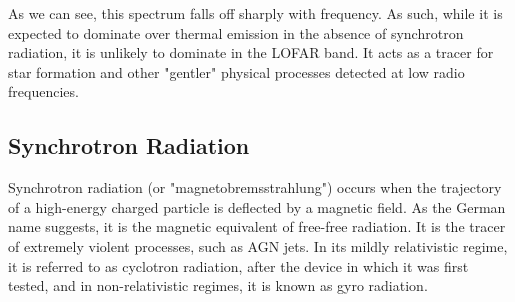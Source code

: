 \pg
As we can see, this spectrum falls off sharply with frequency. As such, while it is expected to dominate over thermal emission in the absence of synchrotron radiation, it is unlikely to dominate in the LOFAR band. It acts as a tracer for star formation and other "gentler" physical processes detected at low radio frequencies.

\subsection{Synchrotron Radiation}
\pg
Synchrotron radiation (or "magnetobremsstrahlung") occurs when the trajectory of a high-energy charged particle is deflected by a magnetic field. As the German name suggests, it is the magnetic equivalent of free-free radiation. It is the tracer of extremely violent processes, such as AGN jets. In its mildly relativistic regime, it is referred to as cyclotron radiation, after the device in which it was first tested, and in non-relativistic regimes, it is known as gyro radiation. 

\pg





